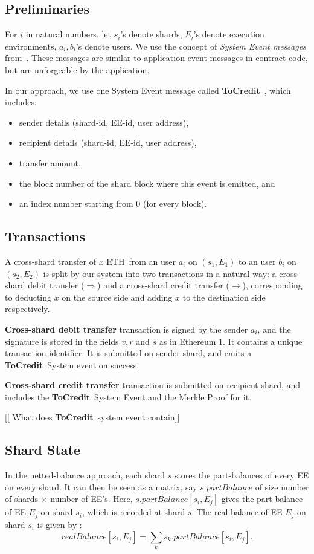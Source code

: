 \documentclass{article}
\newcommand{\eth}[0]{ETH~}
\newcommand{\tocredit}[0]{{\bf ToCredit}~}
\begin{document}
\subsection{Preliminaries}

For $i$ in natural numbers, let
$s_i$'s denote shards, 
$E_i$'s denote execution environments,
$a_i, b_i$'s denote users.
We use the concept of {\em System Event messages} from~\cite{peter-cross-shard}. These messages are similar to application event messages in contract code, but are unforgeable by the application. 

In our approach, we use one System Event message called \tocredit, which includes:
\begin{itemize}
\item sender details (shard-id, EE-id, user address), 
\item recipient details (shard-id, EE-id, user address), 
\item transfer amount, 
\item the block number of the shard block where this event is emitted, and 
\item an index number starting from 0 (for every block).
\end{itemize}

\subsection{Transactions}

A cross-shard transfer of $x$ \eth from an user $a_i$ on $(s_1,E_1)$ to an user $b_i$ on $(s_2,E_2)$ is split by our system into two transactions in a natural way: a cross-shard debit transfer ($\Longrightarrow$) and a cross-shard credit transfer ($\longrightarrow$), corresponding to deducting $x$ on the source side and adding $x$ to the destination side respectively. 

{\bf Cross-shard debit transfer} transaction is signed by the sender $a_i$, and the signature is stored in the fields $v, r$ and $s$ as in Ethereum 1. It contains a unique transaction identifier. It is submitted on sender shard, and emits a \tocredit System event on success.

{\bf Cross-shard credit transfer} transaction is submitted on recipient shard, and includes the \tocredit System Event and the Merkle Proof for it.

[[ What does \tocredit system event contain]]

\subsection{Shard State}
In the netted-balance approach, each shard $s$ stores the part-balances of every EE on every shard. It can then be seen as a matrix, say $s.partBalance$ of size number of shards $\times$ number of EE's. Here, $s.partBalance[s_i,E_j]$ gives the part-balance of EE $E_j$ on shard $s_i$, which is recorded at shard $s$. The real balance of EE $E_j$ on shard $s_i$ is given by : 
\[
	realBalance[s_i,E_j] = \sum_k s_k.partBalance[s_i,E_j].
\]
\end{document}

